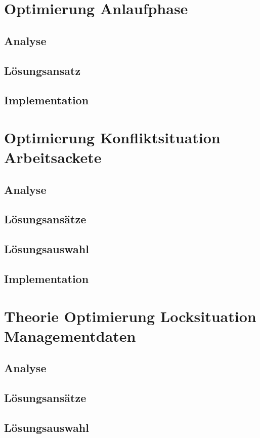 \section{Optimierung Anlaufphase}
\subsection{Analyse}
\subsection{L\"osungsansatz}
\subsection{Implementation}

\section{Optimierung Konfliktsituation Arbeitsackete}
\subsection{Analyse}
\subsection{L\"osungsans\"atze}
\subsection{L\"osungsauswahl}
\subsection{Implementation}

\section{Theorie Optimierung Locksituation Managementdaten}
\subsection{Analyse}
\subsection{L\"osungsans\"atze}
\subsection{L\"osungsauswahl}
